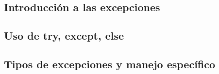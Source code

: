 \subsection{Introducción a las excepciones}
\subsection{Uso de try, except, else}
\subsection{Tipos de excepciones y manejo específico}
